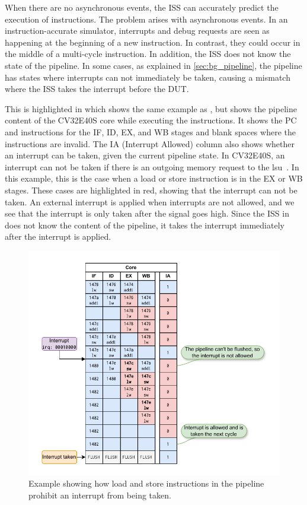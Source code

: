When there are no asynchronous events, the ISS can accurately predict the execution of instructions. The problem arises with asynchronous events. In an instruction-accurate simulator, interrupts and debug requests are seen as happening at the beginning of a new instruction. In contrast, they could occur in the middle of a multi-cycle instruction. In addition, the ISS does not know the state of the pipeline. In some cases, as explained in \cref{sec:bg_pipeline}, the pipeline has states where interrupts can not immediately be taken, causing a mismatch where the ISS takes the interrupt before the DUT.

This is highlighted in  which shows the same example as , but shows the pipeline content of the CV32E40S core while executing the instructions. It shows the PC and instructions for the IF, ID, EX, and WB stages and blank spaces where the instructions are invalid. The IA (Interrupt Allowed) column also shows whether an interrupt can be taken, given the current pipeline state. In CV32E40S, an interrupt can not be taken if there is an outgoing memory request to the \acrshort{lsu}~\cite{openhwgroupExceptionsInterruptsCOREV2023}. In this example, this is the case when a load or store instruction is in the EX or WB stages. These cases are highlighted in red, showing that the interrupt can not be taken. An external interrupt is applied when interrupts are not allowed, and we see that the interrupt is only taken after the  signal goes high. Since the ISS in  does not know the content of the pipeline, it takes the interrupt immediately after the interrupt is applied.

\begin{figure}
    \centering
    \includegraphics[width=1.00\linewidth]{figures/lw_sw_pipeline_example.pdf}
    \caption{Example showing how load and store instructions in the pipeline prohibit an interrupt from being taken.}
    \label{fig:lw_sw_pipeline}
\end{figure}


